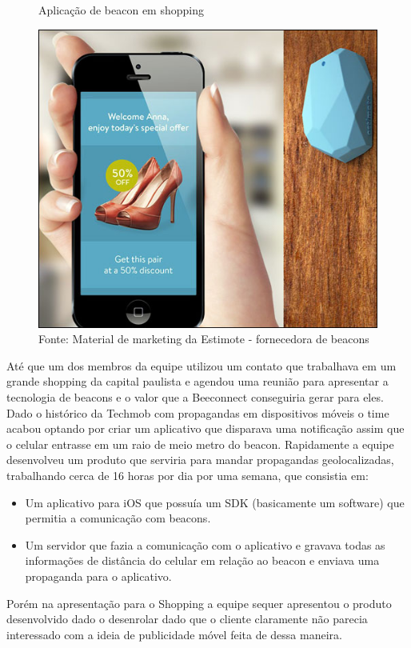 \begin{figure}[H]
\caption{Aplicação de beacon em shopping}
\centerline{\includegraphics[scale=0.5]{img/beaconShopping}}
\label{fig:beaconShopping}
\caption* {Fonte: Material de marketing da Estimote - fornecedora de beacons}
\end{figure}

Até que um dos membros da equipe utilizou um contato que trabalhava em um grande shopping da capital paulista e agendou uma reunião para apresentar a tecnologia de beacons e o valor que a Beeconnect conseguiria gerar para eles. Dado o histórico da Techmob com propagandas em dispositivos móveis o time acabou optando por criar um aplicativo que disparava uma notificação assim que o celular entrasse em um raio de meio metro do beacon. Rapidamente a equipe desenvolveu  um produto que serviria para mandar propagandas geolocalizadas, trabalhando cerca de 16 horas por dia por uma semana, que consistia em:
\begin{itemize}
\item Um aplicativo para iOS que possuía um SDK (basicamente um software) que permitia a comunicação com beacons.
\item Um servidor que fazia a comunicação com o aplicativo e gravava todas as informações de distância do celular em relação ao beacon e enviava uma propaganda para o aplicativo.
\end{itemize}

Porém na apresentação para o Shopping a equipe sequer apresentou o produto desenvolvido dado o desenrolar dado que o cliente claramente não parecia interessado com a ideia de publicidade móvel feita de dessa maneira.

